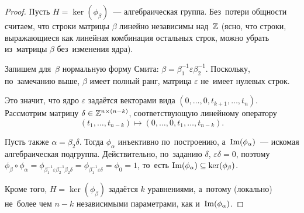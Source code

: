 \documentclass{article}
\begin{document}
\begin{proof}
    Пусть $H = \ker(\phi_\beta)$~— алгебраическая группа. Без~потери общности считаем,
    что строки матрицы $\beta$ линейно независимы над~$\mathbb{Z}$ (ясно, что строки, выражающиеся
    как линейная комбинация остальных строк, можно убрать из~матрицы $\beta$ без~изменения ядра).

    Запишем для~$\beta$ нормальную форму Смита: $\beta = \beta_1^{-1} \varepsilon \beta_2^{-1}$.
    Поскольку, по~замечанию выше, $\beta$ имеет полный ранг, матрица $\varepsilon$ не~имеет нулевых строк.

    Это значит, что ядро $\varepsilon$ задаётся векторами вида $(0, \ldots, 0, t_{k + 1}, \ldots, t_{n})$.
    Рассмотрим матрицу $\delta \in \mathbb{Z}^{n \times (n - k)}$, соответствующую линейному оператору
    $$
        (t_1, \ldots, t_{n - k}) \mapsto (0, \ldots, 0, t_1, \ldots, t_{n - k}).
    $$

    Пусть также $\alpha = \beta_2 \delta$. Тогда $\phi_\alpha$ инъективно по~построению,
    а~$\mathrm{Im}(\phi_{\alpha})$~— искомая алгебраическая подгруппа.
    Действительно, по~заданию $\delta$, $\varepsilon \delta = 0$, поэтому 
    $\phi_{\beta} \circ \phi_{\alpha} = \phi_{\beta_1^{-1} \varepsilon \beta_2^{-1} \beta_2 \delta} = \phi_{\beta_1^{-1} \varepsilon \delta} = \phi_{0} = 1$,
    то~есть $\mathrm{Im}(\phi_{\alpha}) \subseteq \ker(\phi_{\beta})$.

    Кроме того, $H = \ker(\phi_{\beta})$ задаётся $k$ уравнениями, а~потому (локально) не~более
    чем $n - k$ независимыми параметрами, как и~$\mathrm{Im}(\phi_{\alpha})$.
\end{proof}
\end{document}
